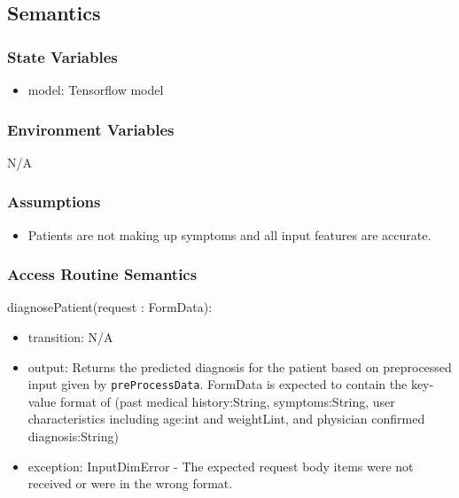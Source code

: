 \documentclass[12pt, titlepage]{article}
\begin{document}
\subsection{Semantics}

\subsubsection{State Variables}

\begin{itemize}
  \item model: Tensorflow model
\end{itemize}

\subsubsection{Environment Variables}

N/A

\subsubsection{Assumptions}

\begin{itemize}
  \item Patients are not making up symptoms and all input features are accurate.
\end{itemize}

\subsubsection{Access Routine Semantics}

\noindent diagnosePatient(request : FormData):
\begin{itemize}
\item transition: N/A
\item output: Returns the predicted diagnosis for the patient based on preprocessed input given by \texttt{preProcessData}. FormData is expected to contain the key-value format of (past medical history:String, symptoms:String, user characteristics including age:int and weightLint, and physician confirmed diagnosis:String)
\item exception: InputDimError - The expected request body items were not received or were in the wrong format.
\end{itemize}
\end{document}
